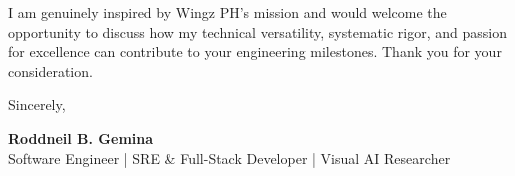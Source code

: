 \documentclass[letterpaper,11pt]{article}
\begin{document}
I am genuinely inspired by Wingz PH's mission and would welcome the opportunity to discuss how my technical versatility, systematic rigor, and passion for excellence can contribute to your engineering milestones. Thank you for your consideration.

Sincerely,

\vspace{12pt}
\textbf{Roddneil B. Gemina} \\
Software Engineer | SRE \& Full-Stack Developer | Visual AI Researcher
\end{document}
